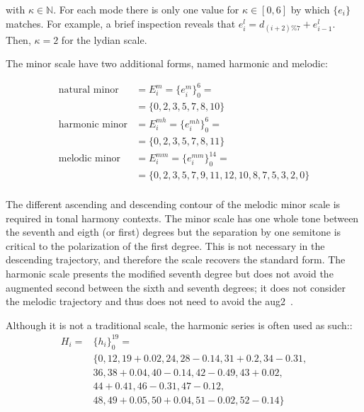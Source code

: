 \noindent with $\kappa \in \mathbb{N}$. For each mode there is only one value for $\kappa \in [0,6]$ by which $\{e_i\}$ matches. 
For example, a brief inspection reveals that
$e_i^{l}=d_{(i+2)\%7}+e_{i-1}^{l}$. Then, $\kappa=2$ for the lydian scale.

The minor scale have two additional forms, named harmonic and melodic:

\begin{equation}\label{eq:escalasMenores}
\begin{split}
\text{natural minor}&  = E_i^m = \{e_i^m\}_0^6 = \\
                                           &  = \{0,2,3,5,7,8,10\} \\
\text{harmonic minor}                      &  = E_i^{mh} = \{e_i^{mh}\}_0^6 = \\
                                           &  = \{0,2,3,5,7,8,11\} \\
\text{melodic minor}                       &  = E_i^{mm} = \{e_i^{mm}\}_0^{14} = \\
                                           &  = \{0,2,3,5,7,9,11,12,10,8,7,5,3,2,0\} \\
\end{split}
\end{equation}

The different ascending and descending contour of the melodic minor scale is required in tonal harmony contexts.
The minor scale has one whole tone between the seventh and eigth (or first) degrees but
the separation by one semitone is critical to the polarization of the first degree.
This is not necessary in the descending trajectory, and therefore the scale recovers the standard form.
The harmonic scale presents the modified seventh degree but does not avoid the augmented second between the sixth and seventh degrees; it does not consider the melodic trajectory and thus does not need to avoid the aug2~\cite{Harmonia}.

Although it is not a traditional scale, the harmonic series is often used as such::
\begin{equation}\label{eq:serieHarmonica}
\begin{split}
H_i = & \{h_i\}_0^{19}= \\
      & \{ 0,12,19+0.02,  24,28-0.14, 31+0.2, 34-0.31, \\
                     & 36, 38+0.04,40-0.14, 42-0.49, 43+0.02, \\
                     & 44+0.41, 46-0.31, 47-0.12, \\
                     & 48, 49+0.05, 50+0.04, 51-0.02, 52-0.14   \}
\end{split}
\end{equation}

